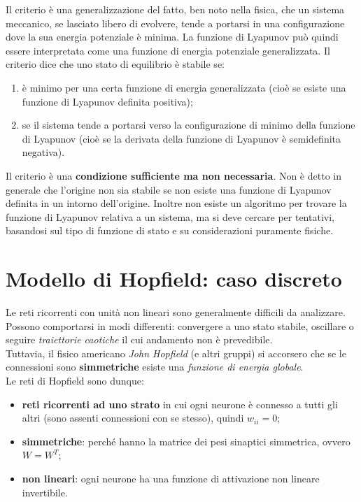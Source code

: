 Il criterio è una generalizzazione del fatto, ben noto nella fisica, che un sistema meccanico, se lasciato libero di evolvere, tende a portarsi in una configurazione dove la sua energia potenziale è minima. La funzione di Lyapunov può quindi essere interpretata come una funzione di energia potenziale generalizzata. Il criterio dice che uno stato di equilibrio è stabile se:
\begin{enumerate}
    \item è minimo per una certa funzione di energia generalizzata (cioè se esiste una funzione di Lyapunov definita positiva);
    \item se il sistema tende a portarsi verso la configurazione di minimo della funzione di Lyapunov (cioè se la derivata della funzione di Lyapunov è semidefinita negativa).
\end{enumerate}
Il criterio è una \textbf{condizione sufficiente ma non necessaria}. Non è detto in generale che l'origine non sia stabile se non esiste una funzione di Lyapunov definita in un intorno dell'origine. Inoltre non esiste un algoritmo per trovare la funzione di Lyapunov relativa a un sistema, ma si deve cercare per tentativi, basandosi sul tipo di funzione di stato e su considerazioni puramente fisiche.




\section{Modello di Hopfield: caso discreto} %
\label{sec:modello_di_hopfield_caso_discreto}

Le reti ricorrenti con unità non lineari sono generalmente difficili da analizzare.  Possono comportarsi in modi differenti: convergere a uno stato stabile, oscillare o seguire \emph{traiettorie caotiche} il cui andamento non è prevedibile.\\

Tuttavia, il fisico americano \emph{John Hopfield} (e altri gruppi) si accorsero che se le connessioni sono \textbf{simmetriche} esiste una \emph{funzione di energia globale}.\\

Le reti di Hopfield sono dunque:
\begin{itemize}
    \item \textbf{reti ricorrenti ad uno strato} in cui ogni neurone è connesso a tutti gli altri (sono assenti
connessioni con se stesso), quindi $w_{ii}=0$;
    \item \textbf{simmetriche}: perché hanno la matrice dei pesi sinaptici simmetrica, ovvero $W=W^T$;
    \item \textbf{non lineari}: ogni neurone ha una funzione di attivazione non lineare invertibile.
\end{itemize}


